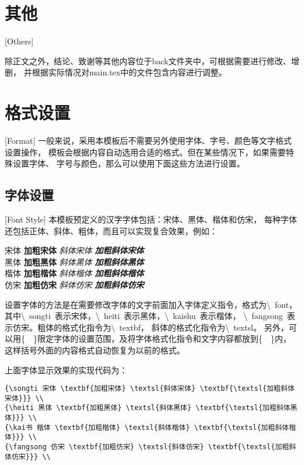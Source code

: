 \section{其他}[Others]

除正文之外，结论、致谢等其他内容位于back文件夹中，可根据需要进行修改、增删，
并根据实际情况对main.tex中的文件包含内容进行调整。

\section{格式设置}[Format]
一般来说，采用本模板后不需要另外使用字体、字号、颜色等文字格式设置操作，
模板会根据内容自动选用合适的格式。但在某些情况下，如果需要特殊设置字体、
字号与颜色，那么可以使用下面这些方法进行设置。

\subsection{字体设置}[Font Style]
本模板预定义的汉字字体包括：{\songti 宋体}、{\heiti 黑体}、{\kaishu 楷体}和{\fangsong 仿宋}，
每种字体还包括正体、斜体、粗体，而且可以实现复合效果，例如：

\begin{flushleft}
  {
  {\songti 宋体 \textbf{加粗宋体} \textsl{斜体宋体} \textbf{\textsl{加粗斜体宋体}}} \\
  {\heiti 黑体 \textbf{加粗黑体} \textsl{斜体黑体} \textbf{\textsl{加粗斜体黑体}}} \\
  {\kaishu 楷体 \textbf{加粗楷体} \textsl{斜体楷体} \textbf{\textsl{加粗斜体楷体}}} \\
  {\fangsong 仿宋 \textbf{加粗仿宋} \textsl{斜体仿宋} \textbf{\textsl{加粗斜体仿宋}}} \\
  }
\end{flushleft}

设置字体的方法是在需要修改字体的文字前面加入字体定义指令，格式为\textbackslash~font，
其中\textbackslash~songti~表示宋体，\textbackslash~heiti~表示黑体，\textbackslash~kaishu~表示楷体，
\textbackslash~fangsong~表示仿宋。粗体的格式化指令为\textbackslash~textbf，
斜体的格式化指令为\textbackslash~textsl。
另外，可以用\{~~\}限定字体的设置范围，及将字体格式化指令和文字内容都放到\{~~\}内，
这样括号外面的内容格式自动恢复为以前的格式。

上面字体显示效果的实现代码为：

\begin{lstlisting}
{\songti 宋体 \textbf{加粗宋体} \textsl{斜体宋体} \textbf{\textsl{加粗斜体宋体}}} \\
{\heiti 黑体 \textbf{加粗黑体} \textsl{斜体黑体} \textbf{\textsl{加粗斜体黑体}}} \\
{\kai书 楷体 \textbf{加粗楷体} \textsl{斜体楷体} \textbf{\textsl{加粗斜体楷体}}} \\
{\fangsong 仿宋 \textbf{加粗仿宋} \textsl{斜体仿宋} \textbf{\textsl{加粗斜体仿宋}}} \\
\end{lstlisting}

